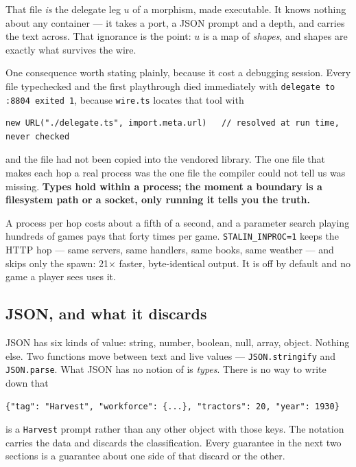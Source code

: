 \documentclass[11pt,a4paper]{article}
\begin{document}
\noindent That file \emph{is} the delegate leg $u$ of a morphism, made
executable. It knows nothing about any container --- it takes a port, a JSON
prompt and a depth, and carries the text across. That ignorance is the point:
$u$ is a map of \emph{shapes}, and shapes are exactly what survives the wire.

One consequence worth stating plainly, because it cost a debugging session. Every file typechecked and the first playthrough died immediately with
\texttt{delegate to :8804 exited 1}, because \texttt{wire.ts} locates that tool with

\begin{lstlisting}
new URL("./delegate.ts", import.meta.url)   // resolved at run time, never checked
\end{lstlisting}

\noindent and the file had not been copied into the vendored library. The one
file that makes each hop a real process was the one file the compiler could not
tell us was missing. \textbf{Types hold within a process; the moment a boundary
is a filesystem path or a socket, only running it tells you the truth.}

A process per hop costs about a fifth of a second, and a parameter search
playing hundreds of games pays that forty times per game. \texttt{STALIN\_INPROC=1}
keeps the HTTP hop --- same servers, same handlers, same books, same weather ---
and skips only the spawn: 21$\times$ faster, byte-identical output. It is off by
default and no game a player sees uses it.

\subsection{JSON, and what it discards}

JSON has six kinds of value: string, number, boolean, null, array, object.
Nothing else. Two functions move between text and live values ---
\texttt{JSON.stringify} and \texttt{JSON.parse}. What JSON has no notion of is
\emph{types}. There is no way to write down that

\begin{lstlisting}
{"tag": "Harvest", "workforce": {...}, "tractors": 20, "year": 1930}
\end{lstlisting}

\noindent is a \texttt{Harvest} prompt rather than any other object with those
keys. The notation carries the data and discards the classification. Every
guarantee in the next two sections is a guarantee about one side of that
discard or the other.
\end{document}
